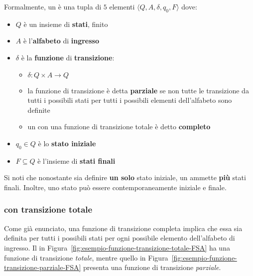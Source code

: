 \documentclass[italian, 10pt]{article}
\begin{document}
Formalmente, un \FSA è una tupla di \(5\) elementi \(\langle Q, A, \delta, q_0, F \rangle\) dove:

\begin{itemize}
  \item \(Q\) è un insieme di \textbf{stati}, finito
  \item \(A\) è l'\textbf{alfabeto} di \textbf{ingresso}
  \item \(\delta\) è la \textbf{funzione} di \textbf{transizione}:
        \begin{itemize}
          \item \(\delta: Q \times A \rightarrow Q\)
          \item la funzione di transizione è detta \textbf{parziale} se non tutte le transizione da tutti i possibili stati per tutti i possibili elementi dell'alfabeto sono definite
          \item un \FSA con una funzione di transizione totale è detto \textbf{completo}
        \end{itemize}
  \item \(q_0 \in Q\) è lo \textbf{stato iniziale}
  \item \(F \subseteq Q\) è l'insieme di \textbf{stati finali}
\end{itemize}

Si noti che nonostante sia definire \textbf{un solo} stato iniziale, un \FSA ammette \textbf{più} stati finali.
Inoltre, uno stato può essere contemporaneamente iniziale e finale.

\subsubsection{\FSA con transizione totale}

Come già enunciato, una funzione di transizione completa implica che essa sia definita per tutti i possibili stati per ogni possibile elemento dell'alfabeto di ingresso.
Il \FSA in Figura~\ref{fig:esempio-funzione-transizione-totale-FSA} ha una funzione di transizione \textit{totale}, mentre quello in Figura~\ref{fig:esempio-funzione-transizione-parziale-FSA} presenta una funzione di transizione \textit{parziale}.
\end{document}
